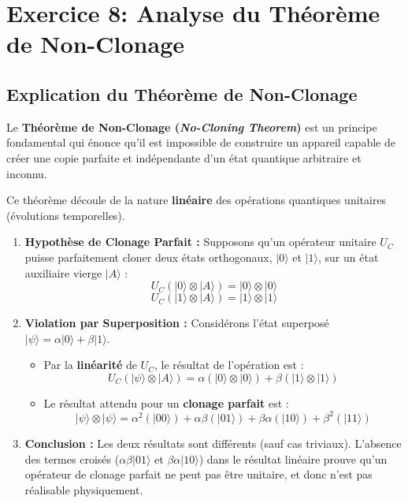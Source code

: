\documentclass[12pt,a4paper]{report}
\begin{document}
\section*{Exercice 8: Analyse du Théorème de Non-Clonage}

\subsection*{Explication du Théorème de Non-Clonage}

Le \textbf{Théorème de Non-Clonage (\textit{No-Cloning Theorem})} est un principe fondamental qui énonce qu'il est impossible de construire un appareil capable de créer une copie parfaite et indépendante d'un état quantique arbitraire et inconnu.

Ce théorème découle de la nature \textbf{linéaire} des opérations quantiques unitaires (évolutions temporelles).

\begin{enumerate}
	\item \textbf{Hypothèse de Clonage Parfait :} Supposons qu'un opérateur unitaire $U_C$ puisse parfaitement cloner deux états orthogonaux, $|0\rangle$ et $|1\rangle$, sur un état auxiliaire vierge $|A\rangle$ :
	$$U_C(|0\rangle \otimes |A\rangle) = |0\rangle \otimes |0\rangle$$
	$$U_C(|1\rangle \otimes |A\rangle) = |1\rangle \otimes |1\rangle$$
	
	\item \textbf{Violation par Superposition :} Considérons l'état superposé $|\psi\rangle = \alpha|0\rangle + \beta|1\rangle$.
	\begin{itemize}
		\item Par la \textbf{linéarité} de $U_C$, le résultat de l'opération est :
		$$U_C(|\psi\rangle \otimes |A\rangle) = \alpha(|0\rangle \otimes |0\rangle) + \beta(|1\rangle \otimes |1\rangle)$$
		\item Le résultat attendu pour un \textbf{clonage parfait} est :
		$$|\psi\rangle \otimes |\psi\rangle = \alpha^2(|00\rangle) + \alpha\beta(|01\rangle) + \beta\alpha(|10\rangle) + \beta^2(|11\rangle)$$
	\end{itemize}
	
	\item \textbf{Conclusion :} Les deux résultats sont différents (sauf cas triviaux). L'absence des termes croisés ($\alpha\beta|01\rangle$ et $\beta\alpha|10\rangle$) dans le résultat linéaire prouve qu'un opérateur de clonage parfait ne peut pas être unitaire, et donc n'est pas réalisable physiquement.
\end{enumerate}
\end{document}
